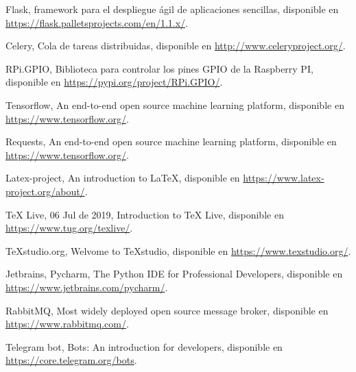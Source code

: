 \begin{thebibliography}{99}
	 Flask, framework para el despliegue ágil de aplicaciones sencillas, disponible en \url{https://flask.palletsprojects.com/en/1.1.x/}.
	
	 Celery, Cola de tareas distribuidas, disponible en \url{http://www.celeryproject.org/}.
	
	 RPi.GPIO, Biblioteca para controlar los pines GPIO de la Raspberry PI, disponible en \url{https://pypi.org/project/RPi.GPIO/}.
	
	 Tensorflow, An end-to-end open source machine learning platform, disponible en \url{https://www.tensorflow.org/}.
	
	 Requests, An end-to-end open source machine learning platform, disponible en \url{https://www.tensorflow.org/}.
	
	 Latex-project, An introduction to LaTeX, disponible en \url{https://www.latex-project.org/about/}.

	 TeX Live, 06 Jul de 2019, Introduction to TeX Live, disponible en \url{https://www.tug.org/texlive/}.
	
	 TeXstudio.org, Welvome to TeXstudio, disponible en \url{https://www.texstudio.org/}.

	 Jetbrains, Pycharm, The Python IDE
	for Professional Developers, disponible en \url{https://www.jetbrains.com/pycharm/}.
	
	 RabbitMQ, Most widely deployed open source message broker, disponible en \url{https://www.rabbitmq.com/}.
	
	 Telegram bot, Bots: An introduction for developers, disponible en \url{https://core.telegram.org/bots}.

	
\end{thebibliography}